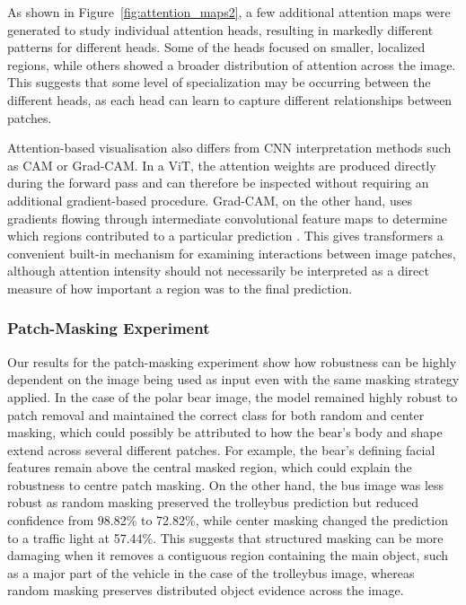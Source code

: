 \documentclass{article}
\begin{document}
As shown in Figure~\ref{fig:attention_maps2}, a few additional attention maps were generated to study individual attention heads, resulting in markedly different patterns for different heads. Some of the heads focused on smaller, localized regions, while others showed a broader distribution of attention across the image. This suggests that some level of specialization may be occurring between the different heads, as each head can learn to capture different relationships between patches.

Attention-based visualisation also differs from CNN interpretation methods such as CAM or Grad-CAM. In a ViT, the attention weights are produced directly during the forward pass and can therefore be inspected without requiring an additional gradient-based procedure. Grad-CAM, on the other hand, uses gradients flowing through intermediate convolutional feature maps to determine which regions contributed to a particular prediction \cite{selvaraju2017gradcam}. This gives transformers a convenient built-in mechanism for examining interactions between image patches, although attention intensity should not necessarily be interpreted as a direct measure of how important a region was to the final prediction.



\subsubsection{Patch-Masking Experiment}
Our results for the patch-masking experiment show how robustness can be highly dependent on the image being used as input even with the same masking strategy applied. In the case of the polar bear image, the model remained highly robust to patch removal and maintained the correct class for both random and center masking, which could possibly be attributed to how the bear’s body and shape extend across several different patches. For example, the bear’s defining facial features remain above the central masked region, which could explain the robustness to centre patch masking. On the other hand, the bus image was less robust as random masking preserved the trolleybus prediction but reduced confidence from 98.82\% to 72.82\%, while center masking changed the prediction to a traffic light at 57.44\%. This suggests that structured masking can be more damaging when it removes a contiguous region containing the main object, such as a major part of the vehicle in the case of the trolleybus image, whereas random masking preserves distributed object evidence across the image.
\end{document}
